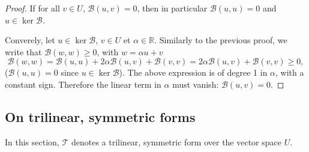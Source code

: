 \documentclass[12pt, final]{scrartcl}
\theoremstyle{definition}
\newcommand{\reals}{\mathbb{R}}
\begin{document}
\begin{proof}
  If for all $v \in U$, $\mathcal{B}(u, v) = 0$, then in particular $\mathcal{B}(u, u) = 0$ and
  $u \in \ker \mathcal{B}$.

  Converely, let $u \in \ker \mathcal{B}$, $v \in U$ et $\alpha \in \reals$. Similarly to the previous proof, we write
  that $\mathcal{B}(w, w) \geq 0$, with $w = \alpha u + v$
  \begin{equation*}
    \mathcal{B}(w, w) = \mathcal{B}(u, u) + 2 \alpha \mathcal{B}(u, v) +\mathcal{B}(v, v) = 2 \alpha \mathcal{B}(u, v) +\mathcal{B}(v, v) \geq 0,
  \end{equation*}
  ($\mathcal{B}(u, u) = 0$ since $u \in \ker \mathcal{B}$). The above expression is of degree 1 in $\alpha$, with a
  constant sign. Therefore the linear term in $\alpha$ must vanish: $\mathcal{B}(u, v) = 0$.
\end{proof}

\subsection{On trilinear, symmetric forms}

In this section, $\mathcal T$ denotes a trilinear, symmetric form over the vector space $U$.
\end{document}
